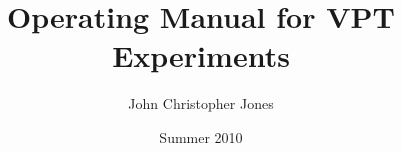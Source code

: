 \documentclass[10pt, onecolumn, oneside, article, letterpaper]{memoir}
\title{Operating Manual for VPT Experiments}
\author{John Christopher Jones}
\date{Summer 2010}
\begin{document}


\maketitle



\mainmatter





















\printglossaries



\backmatter
\end{document}

